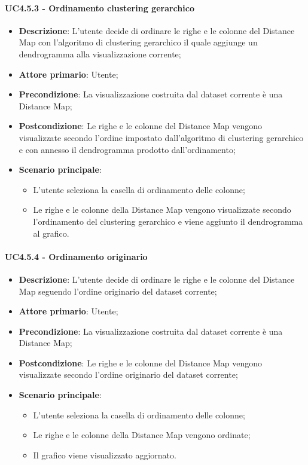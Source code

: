 \paragraph{UC4.5.3 - Ordinamento clustering gerarchico}
\label{par:uc4.5.3}
\begin{itemize}
    \item \textbf{Descrizione}: L'utente decide di ordinare le righe e le colonne del Distance Map con l'algoritmo di clustering gerarchico il quale aggiunge un dendrogramma alla visualizzazione corrente;
    \item \textbf{Attore primario}: Utente;
    \item \textbf{Precondizione}: La visualizzazione costruita dal dataset corrente è una Distance Map;
    \item \textbf{Postcondizione}: Le righe e le colonne del Distance Map vengono visualizzate secondo l'ordine impostato dall'algoritmo di clustering gerarchico e con annesso il dendrogramma prodotto dall'ordinamento;
    \item \textbf{Scenario principale}:
    \begin{itemize}
        \item L'utente seleziona la casella di ordinamento delle colonne;
        \item Le righe e le colonne della Distance Map vengono visualizzate secondo l'ordinamento del clustering gerarchico e viene aggiunto il dendrogramma al grafico.
    \end{itemize}
\end{itemize}

\paragraph{UC4.5.4 - Ordinamento originario}
\label{par:uc4.5.4}
\begin{itemize}
    \item \textbf{Descrizione}: L'utente decide di ordinare le righe e le colonne del Distance Map seguendo l'ordine originario del dataset corrente;
    \item \textbf{Attore primario}: Utente;
    \item \textbf{Precondizione}: La visualizzazione costruita dal dataset corrente è una Distance Map;
    \item \textbf{Postcondizione}: Le righe e le colonne del Distance Map vengono visualizzate secondo l'ordine originario del dataset corrente;
    \item \textbf{Scenario principale}:
    \begin{itemize}
        \item L'utente seleziona la casella di ordinamento delle colonne;
        \item Le righe e le colonne della Distance Map vengono ordinate;
        \item Il grafico viene visualizzato aggiornato.
    \end{itemize}
\end{itemize}

